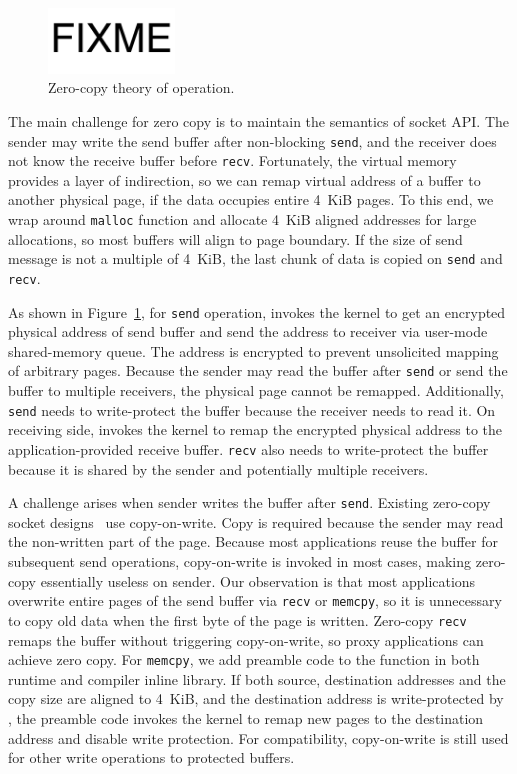 \begin{figure}[t]
	\centering
	\includegraphics[width=0.3\textwidth]{images/fixme}
	\caption{Zero-copy theory of operation.}
	\label{fig:zerocopy}
\end{figure}

The main challenge for zero copy is to maintain the semantics of socket API. The sender may write the send buffer after non-blocking \texttt{send}, and the receiver does not know the receive buffer before \texttt{recv}.
Fortunately, the virtual memory provides a layer of indirection, so we can remap virtual address of a buffer to another physical page, if the data occupies entire 4~KiB pages.
To this end, we wrap around \texttt{malloc} function and allocate 4~KiB aligned addresses for large allocations, so most buffers will align to page boundary.
If the size of send message is not a multiple of 4~KiB, the last chunk of data is copied on \texttt{send} and \texttt{recv}.

As shown in Figure~\ref{fig:zerocopy}, for \texttt{send} operation, \libipc{} invokes the kernel to get an encrypted physical address of send buffer and send the address to receiver via user-mode shared-memory queue.
The address is encrypted to prevent unsolicited mapping of arbitrary pages.
Because the sender may read the buffer after \texttt{send} or send the buffer to multiple receivers, the physical page cannot be remapped.
Additionally, \texttt{send} needs to write-protect the buffer because the receiver needs to read it.
On receiving side, \libipc{} invokes the kernel to remap the encrypted physical address to the application-provided receive buffer.
\texttt{recv} also needs to write-protect the buffer because it is shared by the sender and potentially multiple receivers.

A challenge arises when sender writes the buffer after \texttt{send}.
Existing zero-copy socket designs~\cite{thadani1995efficient,chu1996zero} use copy-on-write. Copy is required because the sender may read the non-written part of the page.
Because most applications reuse the buffer for subsequent send operations, copy-on-write is invoked in most cases, making zero-copy essentially useless on sender.
Our observation is that most applications overwrite entire pages of the send buffer via \texttt{recv} or \texttt{memcpy}, so it is unnecessary to copy old data when the first byte of the page is written.
Zero-copy \texttt{recv} remaps the buffer without triggering copy-on-write, so proxy applications can achieve zero copy.
For \texttt{memcpy}, we add preamble code to the function in both \libipc{} runtime and compiler inline library. If both source, destination addresses and the copy size are aligned to 4~KiB, and the destination address is write-protected by \libipc{}, the preamble code invokes the kernel to remap new pages to the destination address and disable write protection.
For compatibility, copy-on-write is still used for other write operations to protected buffers.

